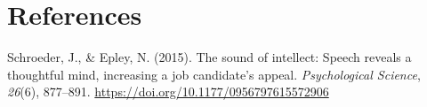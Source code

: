 \documentclass[
  english,
  man]{apa6}
\begin{document}
\newpage

\hypertarget{references}{%
\section{References}\label{references}}

\begingroup
\setlength{\parindent}{-0.5in}
\setlength{\leftskip}{0.5in}

\hypertarget{refs}{}
\leavevmode\hypertarget{ref-schroeder_sound_2015}{}%
Schroeder, J., \& Epley, N. (2015). The sound of intellect: Speech reveals a thoughtful mind, increasing a job candidate's appeal. \emph{Psychological Science}, \emph{26}(6), 877--891. \url{https://doi.org/10.1177/0956797615572906}

\endgroup
\end{document}
